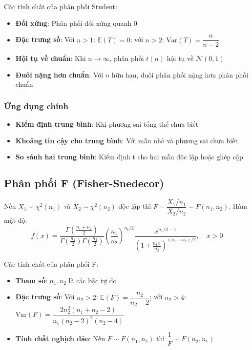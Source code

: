 \begin{tinhchat}
Các tính chất của phân phối Student:
\begin{itemize}
    \item \textbf{Đối xứng}: Phân phối đối xứng quanh 0
    \item \textbf{Đặc trưng số}: Với $n>1$: $\mathbb{E}(T)=0$; với $n>2$: $\text{Var}(T)=\dfrac{n}{n-2}$
    \item \textbf{Hội tụ về chuẩn}: Khi $n\to\infty$, phân phối $t(n)$ hội tụ về $\mathcal{N}(0,1)$
    \item \textbf{Đuôi nặng hơn chuẩn}: Với $n$ hữu hạn, đuôi phân phối nặng hơn phân phối chuẩn
\end{itemize}
\end{tinhchat}

\subsubsection*{Ứng dụng chính}
\begin{itemize}
    \item \textbf{Kiểm định trung bình}: Khi phương sai tổng thể chưa biết
    \item \textbf{Khoảng tin cậy cho trung bình}: Với mẫu nhỏ và phương sai chưa biết
    \item \textbf{So sánh hai trung bình}: Kiểm định t cho hai mẫu độc lập hoặc ghép cặp
\end{itemize}

\subsection{Phân phối F (Fisher-Snedecor)}
\begin{dn}
Nếu $X_1\sim\chi^2(n_1)$ và $X_2\sim\chi^2(n_2)$ độc lập thì $F=\dfrac{X_1/n_1}{X_2/n_2}\sim F(n_1,n_2)$. Hàm mật độ:
\[
f(x)=\frac{\Gamma\left(\frac{n_1+n_2}{2}\right)}{\Gamma\left(\frac{n_1}{2}\right)\Gamma\left(\frac{n_2}{2}\right)}\left(\frac{n_1}{n_2}\right)^{n_1/2}\frac{x^{n_1/2-1}}{(1+\frac{n_1x}{n_2})^{(n_1+n_2)/2}}, \quad x>0
\]
\end{dn}

\begin{tinhchat}
Các tính chất của phân phối F:
\begin{itemize}
    \item \textbf{Tham số}: $n_1, n_2$ là các bậc tự do
    \item \textbf{Đặc trưng số}: Với $n_2>2$: $\mathbb{E}(F)=\dfrac{n_2}{n_2-2}$; với $n_2>4$: $\text{Var}(F)=\dfrac{2n_2^2(n_1+n_2-2)}{n_1(n_2-2)^2(n_2-4)}$
    \item \textbf{Tính chất nghịch đảo}: Nếu $F\sim F(n_1,n_2)$ thì $\dfrac{1}{F}\sim F(n_2,n_1)$
\end{itemize}
\end{tinhchat}

